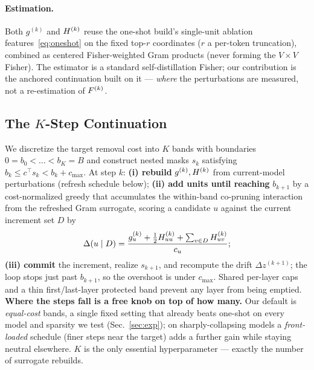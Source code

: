 \paragraph{Estimation.} Both $g^{(k)}$ and $H^{(k)}$ reuse the one-shot build's single-unit ablation
features~\eqref{eq:oneshot} on the fixed top-$r$ coordinates ($r$ a per-token truncation), combined as
centered Fisher-weighted Gram products (never forming the $V{\times}V$ Fisher). The estimator is a standard
self-distillation Fisher; our contribution is the anchored continuation built on it --- \emph{where} the
perturbations are measured, not a re-estimation of $F^{(k)}$.

\subsection{The $K$-Step Continuation}
We discretize the target removal cost into $K$ bands with boundaries $0=b_0<\dots<b_K=B$ and construct
nested masks $s_k$ satisfying $b_k\le c^\top s_k<b_k+c_{\max}$. At
step $k$: \textbf{(i) rebuild} $g^{(k)},H^{(k)}$ from current-model perturbations (refresh schedule below);
\textbf{(ii) add units until reaching} $b_{k+1}$ by a cost-normalized greedy that accumulates the
within-band co-pruning interaction from the refreshed Gram surrogate, scoring a candidate $u$ against
the current increment set $D$ by
\begin{equation}
\Delta(u\mid D)=\frac{g^{(k)}_u+\tfrac12 H^{(k)}_{uu}+\sum_{v\in D}H^{(k)}_{uv}}{c_u};
\label{eq:marginal}
\end{equation}
\textbf{(iii) commit} the increment, realize $s_{k+1}$, and recompute the drift $\Delta z^{(k+1)}$; the
loop stops just past $b_{k+1}$, so the overshoot is under $c_{\max}$. Shared per-layer caps and a thin
first/last-layer protected band prevent any layer from being emptied. \textbf{Where the steps fall is a
free knob on top of how many.} Our default is \emph{equal-cost} bands, a single fixed setting that already
beats one-shot on every model and sparsity we test (Sec.~\ref{sec:exp}); on sharply-collapsing models a
\emph{front-loaded} schedule (finer steps near the target) adds a further gain while staying neutral
elsewhere. $K$ is the only essential hyperparameter --- exactly the number of surrogate rebuilds.

